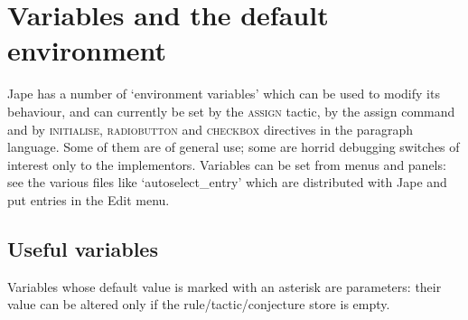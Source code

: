 \section{Variables and the default environment}


Jape has a number of `environment variables' which can be used to modify its behaviour, and can currently be set by the \textsc{assign} tactic, by the assign command and by \textsc{initialise, radiobutton} and \textsc{checkbox} directives in the paragraph language. Some of them are of general use; some are horrid debugging switches of interest only to the implementors. Variables can be set from menus and panels: see the various files like `autoselect\_entry' which are distributed with Jape and put entries in the Edit menu.


\subsection{Useful variables}


Variables whose default value is marked with an asterisk are parameters: their value can be altered only if the rule/tactic/conjecture store is empty.



